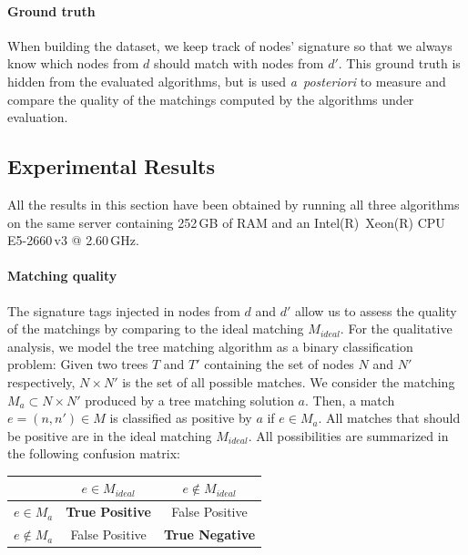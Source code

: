 \paragraph{Ground truth}
When building the dataset, we keep track of nodes' signature so that we always know which nodes from $d$ should match with nodes from $d'$.
This ground truth is hidden from the evaluated algorithms, but is used \emph{a~posteriori} to measure and compare the quality of the matchings computed by the algorithms under evaluation.

\subsection{Experimental Results}\label{sftm:sec:performances}
All the results in this section have been obtained by running all three algorithms on the same server containing 252\,GB of RAM and an Intel(R)~Xeon(R) CPU E5-2660\,v3 @ 2.60\,GHz.

\paragraph{Matching quality}
The signature tags injected in nodes from $d$ and $d'$ allow us to assess the quality of the matchings by comparing to the ideal matching $M_{ideal}$.
For the qualitative analysis, we model the tree matching algorithm as a binary classification problem: Given two trees $T$ and $T'$ containing the set of nodes $N$ and $N'$ respectively, $N \times N'$ is the set of all possible matches.
We consider the matching $M_a \subset N \times N'$ produced by a tree matching solution $a$.
Then, a match $e=(n,n') \in M$ is classified as positive by $a$ if $e \in M_a$.
All matches that should be positive are in the ideal matching $M_{ideal}$.
All possibilities are summarized in the following confusion matrix:
\begin{center}
    \begin{tabular}[h]{l|c|c|}
    \cline{2-3} 
    
                                          & $e \in M_{ideal}$ & $e \notin M_{ideal}$ \\
    \hline
    \multicolumn{1}{|l|}{$e \in M_a$}    & \textbf{True Positive} & False Positive\\
    \hline
    \multicolumn{1}{|l|}{$e \notin M_a$} &         False Positive & \textbf{True Negative}\\
    \hline
    \end{tabular}
\end{center}

